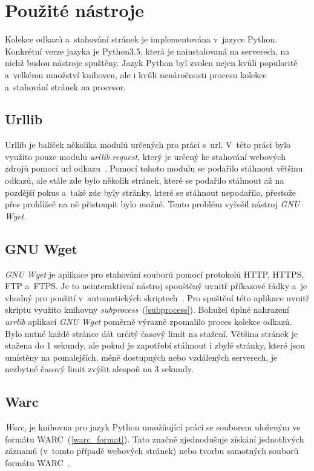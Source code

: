 \section{Použité nástroje}
Kolekce odkazů a~stahování stránek je implementována v~jazyce Python. Konkrétní verze jazyka je Python3.5, která je nainstalovaná na serverech,
na nichž budou nástroje spuštěny. Jazyk Python byl zvolen nejen kvůli popularitě a~velkému množství knihoven, ale i kvůli nenáročnosti
procesu kolekce a~stahování stránek na procesor.

\subsection{Urllib}
\label{urllib}
Urllib je balíček několika modulů určených pro práci s~url. V~této práci bylo využito pouze modulu \textit{urllib.request},
který je určený ke stahování webových zdrojů pomocí url odkazu~\cite{URLLIB}. Pomocí tohoto modulu se podařilo stáhnout většinu
odkazů, ale stále zde bylo několik stránek, které se podařilo stáhnout až na pozdější pokus a~také zde byly stránky, které
se stáhnout nepodařilo, přestože přes prohlížeč na ně přistoupit bylo možné. Tento problém vyřešil nástroj \textit{GNU Wget}.

\subsection{GNU Wget}
\label{wget}
\textit{GNU Wget} je aplikace pro stahování souborů pomocí protokolů HTTP, HTTPS, FTP a~FTPS. Je to neinteraktivní nástroj spouštěný uvnitř
příkazové řádky a~je vhodný pro použití v~automatických skriptech~\cite{WGET}. Pro spuštění této aplikace uvnitř skriptu využito knihovny \textit{subprocess}~(\ref{subprocess}).
Bohužel úplné nahrazení \textit{urrlib} aplikací \textit{GNU Wget} poměrně výrazně zpomalilo proces kolekce odkazů. Bylo nutné každé stránce dát určitý časový limit
na stažení. Většina stránek je stažena do 1 sekundy, ale pokud je zapotřebí stáhnout i zbylé stránky, které jsou umístěny na pomalejších, méně dostupných
nebo vzdálených serverech, je nezbytné časový limit zvýšit alespoň na 3 sekundy.

\subsection{Warc}
\label{warc}
\textit{Warc}, je knihovna pro jazyk Python umožňující práci se souborem uloženým ve formátu WARC~(\ref{warc_format}). Tato
značně zjednodušuje získání jednotlivých záznamů (v~tomto případě webových stránek) nebo tvorbu samotných souborů
formátu WARC~\cite{WARC}.

